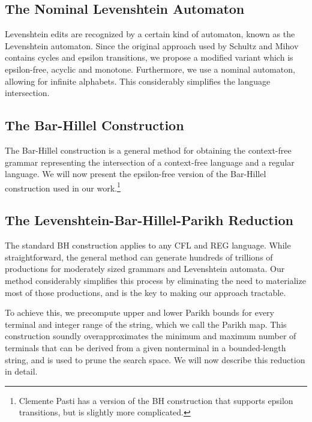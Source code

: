 \subsection{The Nominal Levenshtein Automaton}

Levenshtein edits are recognized by a certain kind of automaton, known as the Levenshtein automaton. Since the original approach used by Schultz and Mihov contains cycles and epsilon transitions, we propose a modified variant which is epsilon-free, acyclic and monotone. Furthermore, we use a nominal automaton, allowing for infinite alphabets. This considerably simplifies the language intersection.

\subsection{The Bar-Hillel Construction}

The Bar-Hillel construction is a general method for obtaining the context-free grammar representing the intersection of a context-free language and a regular language. We will now present the epsilon-free version of the Bar-Hillel construction used in our work.\footnote{Clemente Pasti has a version of the BH construction that supports epsilon transitions, but is slightly more complicated.}

\subsection{The Levenshtein-Bar-Hillel-Parikh Reduction}

The standard BH construction applies to any CFL and REG language. While straightforward, the general method can generate hundreds of trillions of productions for moderately sized grammars and Levenshtein automata. Our method considerably simplifies this process by eliminating the need to materialize most of those productions, and is the key to making our approach tractable.

To achieve this, we precompute upper and lower Parikh bounds for every terminal and integer range of the string, which we call the Parikh map. This construction soundly overapproximates the minimum and maximum number of terminals that can be derived from a given nonterminal in a bounded-length string, and is used to prune the search space. We will now describe this reduction in detail.